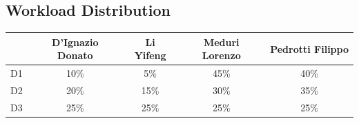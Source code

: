 \documentclass[12pt,a4paper]{article}
\begin{document}
        \subsection{Workload Distribution}
            \begin{tabular}{|c|c|c|c|c|}
                \hline
                & D'Ignazio Donato & Li Yifeng & Meduri Lorenzo & Pedrotti Filippo \\ \hline
                D1 & 10\% & 5\% & 45\% & 40\% \\ \hline
                D2 & 20\% & 15\% & 30\% & 35\% \\ \hline
                D3 & 25\% & 25\% & 25\% & 25\% \\ \hline
   
            \end{tabular}

	
\end{document}
